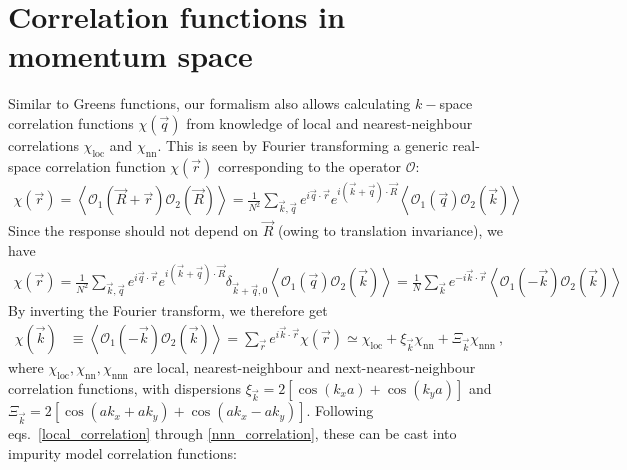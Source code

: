 \documentclass[prb]{revtex4-2}
\begin{document}
\section{Correlation functions in momentum space}
Similar to Greens functions, our formalism also allows calculating \(k-\)space correlation functions \(\chi(\vec q)\) from knowledge of local and nearest-neighbour correlations \(\chi_\text{loc}\) and \(\chi_\text{nn}\). This is seen by Fourier transforming a generic real-space correlation function \(\chi(\vec r)\) corresponding to the operator \(\mathcal{O}\):
\begin{equation}\begin{aligned}
	\chi(\vec r) = \left<\mathcal{O}_1 (\vec R + \vec r) \mathcal{O}_2(\vec R)\right> = \frac{1}{N^2}\sum_{\vec k, \vec q} e^{i \vec q \cdot \vec r}e^{i \left(\vec k + \vec q\right) \cdot \vec R}\left<\mathcal{O}_1 (\vec q) \mathcal{O}_2(\vec k)\right>
\end{aligned}\end{equation}
Since the response should not depend on \(\vec R\) (owing to translation invariance), we have
\begin{equation}\begin{aligned}
	\chi(\vec r) = \frac{1}{N^2}\sum_{\vec k, \vec q} e^{i \vec q \cdot \vec r}e^{i \left(\vec k + \vec q\right) \cdot \vec R}\delta_{\vec k + \vec q, 0}\left<\mathcal{O}_1 (\vec q) \mathcal{O}_2(\vec k)\right> = \frac{1}{N}\sum_{\vec k} e^{-i \vec k \cdot \vec r}\left<\mathcal{O}_1 (-\vec k) \mathcal{O}_2(\vec k)\right>
\end{aligned}\end{equation}
By inverting the Fourier transform, we therefore get
\begin{equation}\begin{aligned}
	\chi(\vec k) &\equiv \left<\mathcal{O}_1 (-\vec k) \mathcal{O}_2(\vec k)\right> = \sum_{\vec r}e^{i \vec{k}\cdot\vec{r}} \chi(\vec r) \simeq \chi_\text{loc} + \xi_{\vec k} \chi_\text{nn} + \Xi_{\vec k}\chi_\text{nnn}~,
\end{aligned}\end{equation}
where \(\chi_\text{loc},\chi_\text{nn},\chi_\text{nnn}\) are local, nearest-neighbour and next-nearest-neighbour correlation functions, with dispersions \(\xi_{\vec k} = 2\left[\cos(k_x a) + \cos\left(k_y a\right)\right] \) and \(\Xi_{\vec k} = 2\left[\cos \left(ak_x + ak_y\right) + \cos \left( ak_x - ak_y \right) \right] \). Following eqs.~\ref{local_correlation} through \ref{nnn_correlation}, these can be cast into impurity model correlation functions:
\end{document}

